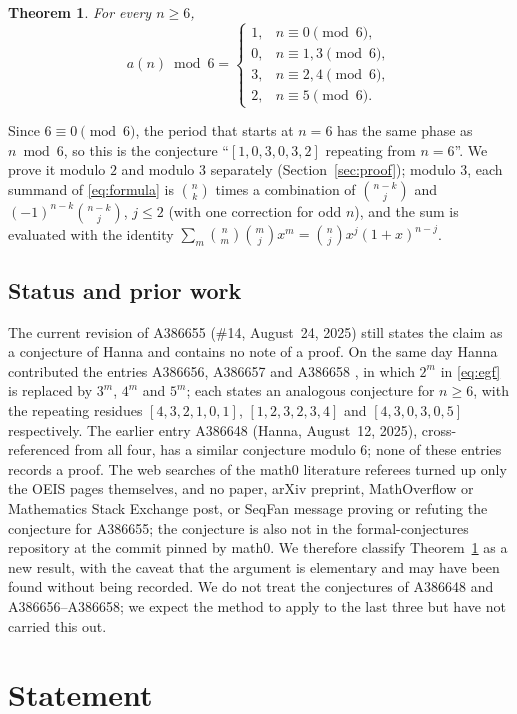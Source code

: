 \documentclass[11pt]{amsart}
\theoremstyle{plain}
\newtheorem{theorem}{Theorem}
\theoremstyle{definition}
\begin{document}
\begin{theorem}\label{thm:main}
For every $n\ge6$,
\[
  a(n)\bmod 6=\begin{cases}1,&n\equiv0\pmod 6,\\0,&n\equiv1,3\pmod6,\\3,&n\equiv2,4\pmod6,\\2,&n\equiv5\pmod6.\end{cases}
\]
\end{theorem}

Since $6\equiv0\pmod6$, the period that starts at $n=6$ has the same phase as $n\bmod6$, so this is the conjecture ``$[1,0,3,0,3,2]$ repeating from $n=6$''.
We prove it modulo $2$ and modulo $3$ separately (Section~\ref{sec:proof}); modulo $3$, each summand of \eqref{eq:formula} is $\binom nk$ times a combination of $\binom{n-k}{j}$ and $(-1)^{n-k}\binom{n-k}{j}$, $j\le2$ (with one correction for odd $n$), and the sum is evaluated with the identity $\sum_m\binom nm\binom mj x^m=\binom njx^j(1+x)^{n-j}$.

\subsection*{Status and prior work}
The current revision of A386655 (\#14, August~24, 2025) still states the claim as a conjecture of Hanna and contains no note of a proof.
On the same day Hanna contributed the entries A386656, A386657 and A386658 \cite{A386656,A386657,A386658}, in which $2^m$ in \eqref{eq:egf} is replaced by $3^m$, $4^m$ and $5^m$; each states an analogous conjecture for $n\ge6$, with the repeating residues $[4,3,2,1,0,1]$, $[1,2,3,2,3,4]$ and $[4,3,0,3,0,5]$ respectively.
The earlier entry A386648 \cite{A386648} (Hanna, August~12, 2025), cross-referenced from all four, has a similar conjecture modulo $6$; none of these entries records a proof.
The web searches of the math0 literature referees turned up only the OEIS pages themselves, and no paper, arXiv preprint, MathOverflow or Mathematics Stack Exchange post, or SeqFan message proving or refuting the conjecture for A386655; the conjecture is also not in the formal-conjectures repository \cite{FC} at the commit pinned by math0.
We therefore classify Theorem~\ref{thm:main} as a new result, with the caveat that the argument is elementary and may have been found without being recorded.
We do not treat the conjectures of A386648 and A386656--A386658; we expect the method to apply to the last three but have not carried this out.

\section{Statement}\label{sec:statement}
\end{document}
